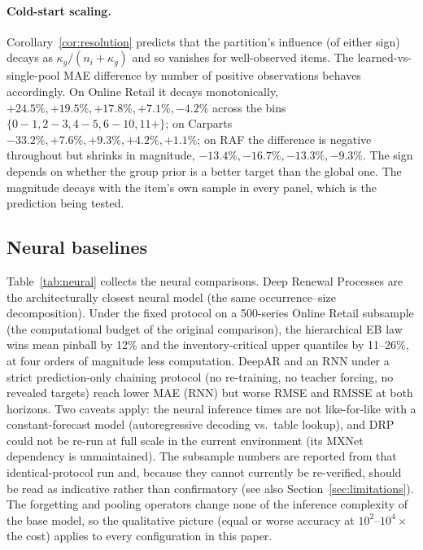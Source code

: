 \documentclass[twocolumn,10pt]{article}
\begin{document}
\paragraph{Cold-start scaling.} Corollary~\ref{cor:resolution} predicts
that the partition's influence (of either sign) decays as
$\kappa_g/(n_i+\kappa_g)$ and so vanishes for well-observed items. The
learned-vs-single-pool MAE difference by number of positive observations
behaves accordingly. On Online Retail it decays monotonically,
$+24.5\%,+19.5\%,+17.8\%,+7.1\%,-4.2\%$ across the bins
$\{0\!-\!1,2\!-\!3,4\!-\!5,6\!-\!10,11+\}$; on Carparts
$-33.2\%,+7.6\%,+9.3\%,+4.2\%,+1.1\%$; on RAF the difference is negative
throughout but shrinks in magnitude, $-13.4\%,-16.7\%,-13.3\%,-9.3\%$.
The sign depends on whether the group prior is a better target than the
global one. The magnitude decays with the item's own sample in every
panel, which is the prediction being tested.

\subsection{Neural baselines}
\label{app:neural}

Table~\ref{tab:neural} collects the neural comparisons. Deep Renewal
Processes \citep{turkmen2019} are the architecturally closest neural
model (the same occurrence--size decomposition). Under the fixed
protocol on a 500-series Online Retail subsample (the computational
budget of the original comparison), the hierarchical EB law wins mean
pinball by 12\% and the inventory-critical upper quantiles by 11--26\%,
at four orders of magnitude less computation. DeepAR and an RNN under a
strict prediction-only chaining protocol (no re-training, no teacher
forcing, no revealed targets) reach lower MAE (RNN) but worse RMSE and
RMSSE at both horizons. Two caveats apply: the neural inference times
are not like-for-like with a constant-forecast model (autoregressive
decoding vs.\ table lookup), and DRP could not be re-run at full scale
in the current environment (its MXNet dependency is unmaintained). The
subsample numbers are reported from that identical-protocol run and,
because they cannot currently be re-verified, should be read as
indicative rather than confirmatory (see also
Section~\ref{sec:limitations}). The forgetting and pooling operators
change none of the inference complexity of the base model, so the
qualitative picture (equal or worse accuracy at $10^2$--$10^4\times$
the cost) applies to every configuration in this paper.
\end{document}
